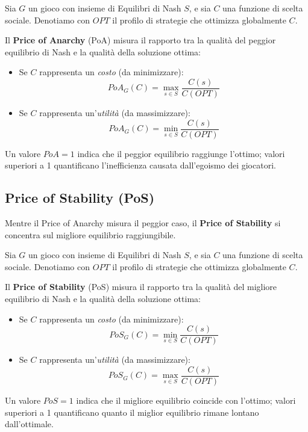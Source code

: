 \begin{definizione}
    Sia $G$ un gioco con insieme di Equilibri di Nash $S$, e sia $C$ una funzione di scelta sociale. Denotiamo con $OPT$ il profilo di strategie che ottimizza globalmente $C$.
    
    Il \textbf{Price of Anarchy} (PoA) misura il rapporto tra la qualità del peggior equilibrio di Nash e la qualità della soluzione ottima:
    \begin{itemize}
        \item Se $C$ rappresenta un \textit{costo} (da minimizzare):
        \[
        PoA_G(C) = \max_{s \in S} \frac{C(s)}{C(OPT)}
        \]
        \item Se $C$ rappresenta un'\textit{utilità} (da massimizzare):
        \[
        PoA_G(C) = \min_{s \in S} \frac{C(s)}{C(OPT)}
        \]
    \end{itemize}
    
    Un valore $PoA = 1$ indica che il peggior equilibrio raggiunge l'ottimo; valori superiori a 1 quantificano l'inefficienza causata dall'egoismo dei giocatori.
\end{definizione}

\subsection{Price of Stability (PoS)}

Mentre il Price of Anarchy misura il peggior caso, il \textbf{Price of Stability} si concentra sul migliore equilibrio raggiungibile.

\begin{definizione}
    Sia $G$ un gioco con insieme di Equilibri di Nash $S$, e sia $C$ una funzione di scelta sociale. Denotiamo con $OPT$ il profilo di strategie che ottimizza globalmente $C$.
    
    Il \textbf{Price of Stability} (PoS) misura il rapporto tra la qualità del migliore equilibrio di Nash e la qualità della soluzione ottima:
    \begin{itemize}
        \item Se $C$ rappresenta un \textit{costo} (da minimizzare):
        \[
        PoS_G(C) = \min_{s \in S} \frac{C(s)}{C(OPT)}
        \]
        \item Se $C$ rappresenta un'\textit{utilità} (da massimizzare):
        \[
        PoS_G(C) = \max_{s \in S} \frac{C(s)}{C(OPT)}
        \]
    \end{itemize}
    
    Un valore $PoS = 1$ indica che il migliore equilibrio coincide con l'ottimo; valori superiori a 1 quantificano quanto il miglior equilibrio rimane lontano dall'ottimale.
\end{definizione}

